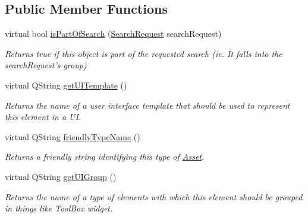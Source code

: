 \subsection*{Public Member Functions}
\begin{DoxyCompactItemize}
\item 
virtual bool \hyperlink{class_picto_1_1_analysis_function_a8faf06ff05f44cbb4fe466e8c8880776}{is\-Part\-Of\-Search} (\hyperlink{struct_search_request}{Search\-Request} search\-Request)
\begin{DoxyCompactList}\small\item\em Returns true if this object is part of the requested search (ie. It falls into the search\-Request's group) \end{DoxyCompactList}\item 
\hypertarget{class_picto_1_1_analysis_function_a18399900e97d5d6aac401e412df39fbe}{virtual Q\-String \hyperlink{class_picto_1_1_analysis_function_a18399900e97d5d6aac401e412df39fbe}{get\-U\-I\-Template} ()}\label{class_picto_1_1_analysis_function_a18399900e97d5d6aac401e412df39fbe}

\begin{DoxyCompactList}\small\item\em Returns the name of a user interface template that should be used to represent this element in a U\-I. \end{DoxyCompactList}\item 
virtual Q\-String \hyperlink{class_picto_1_1_analysis_function_ac0a9fa7cbc9471ead4d11f069745fb05}{friendly\-Type\-Name} ()
\begin{DoxyCompactList}\small\item\em Returns a friendly string identifying this type of \hyperlink{class_picto_1_1_asset}{Asset}. \end{DoxyCompactList}\item 
\hypertarget{class_picto_1_1_analysis_function_ae1d0baa248b7c0266037de44f9860e9f}{virtual Q\-String \hyperlink{class_picto_1_1_analysis_function_ae1d0baa248b7c0266037de44f9860e9f}{get\-U\-I\-Group} ()}\label{class_picto_1_1_analysis_function_ae1d0baa248b7c0266037de44f9860e9f}

\begin{DoxyCompactList}\small\item\em Returns the name of a type of elements with which this element should be grouped in things like Tool\-Box widget. \end{DoxyCompactList}\end{DoxyCompactItemize}
